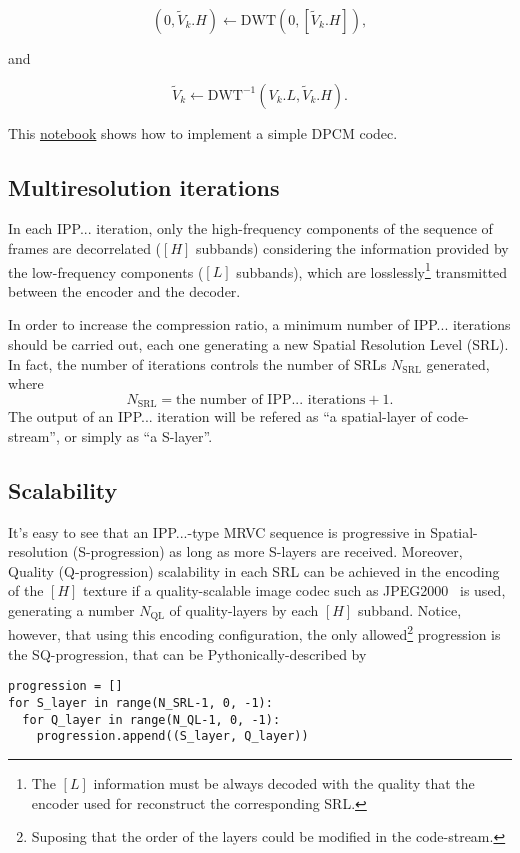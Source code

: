 \begin{equation}
  (0, \tilde{V}_k.H) \leftarrow \text{DWT}(0, [\tilde{V}_k.H]),
  \tag{j}
\end{equation}

and

\begin{equation}
  \tilde{V}_k \leftarrow \text{DWT}^{-1}(V_k.L, \tilde{V}_k.H).
  \tag{k}
\end{equation}

This
\href{https://github.com/Sistemas-Multimedia/Sistemas-Multimedia.github.io/blob/master/milestones/12-IPP_coding/DPCM.ipynb}{notebook}
shows how to implement a simple DPCM codec.

\subsection{Multiresolution iterations}
In each IPP... iteration, only the high-frequency components of the
sequence of frames are decorrelated ($[H]$ subbands) considering the
information provided by the low-frequency components ($[L]$ subbands),
which are losslessly\footnote{The $[L]$ information must be always
decoded with the quality that the encoder used for reconstruct the
corresponding SRL.} transmitted between the encoder and the decoder.

In order to increase the compression ratio, a minimum number of
IPP... iterations should be carried out, each one generating a new
Spatial Resolution Level (SRL). In fact, the number of iterations
controls the number of SRLs $N_{\text{SRL}}$ generated, where
\begin{equation}
  N_{\text{SRL}} = \text{the number of IPP... iterations} + 1.
\end{equation}
The output of an IPP... iteration will be refered as ``a
spatial-layer of code-stream'', or simply as ``a S-layer''.

\subsection{Scalability}
It's easy to see that an IPP...-type MRVC sequence is progressive in
Spatial-resolution (S-progression) as long as more S-layers are
received. Moreover, Quality (Q-progression) scalability in each SRL
can be achieved in the encoding of the $[H]$ texture if a
quality-scalable image codec such as
JPEG2000~\cite{taubman2002jpeg2000} is used, generating a number
$N_{\text{QL}}$ of quality-layers by each $[H]$ subband. Notice,
however, that using this encoding configuration, the only
allowed\footnote{Suposing that the order of the layers could be
modified in the code-stream.} progression is the SQ-progression, that
can be Pythonically-described by
\begin{verbatim}
progression = []
for S_layer in range(N_SRL-1, 0, -1):
  for Q_layer in range(N_QL-1, 0, -1):
    progression.append((S_layer, Q_layer))
\end{verbatim}

